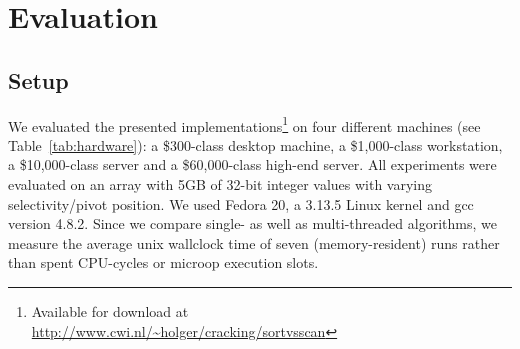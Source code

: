 \section{Evaluation}
\label{sec:results}

\subsection*{Setup}
\label{sec:hardware-platforms}
We evaluated the presented implementations\footnote{Available for
  download
  at\\\mbox{\hspace{.5em}\url{http://www.cwi.nl/~holger/cracking/sortvsscan}}}
on four different machines (see Table~\ref{tab:hardware}): a
\$300-class desktop machine, a \$1,000-class workstation, a
\$10,000-class server and a \$60,000-class high-end server.  All
experiments were evaluated on an array with 5GB of 32-bit integer
values with varying selectivity/pivot position. We used Fedora 20, a
3.13.5 Linux kernel and gcc version 4.8.2. Since we compare single- as
well as multi-threaded algorithms, we measure the average unix
wallclock time of seven (memory-resident) runs rather than spent
CPU-cycles or microop execution slots.
